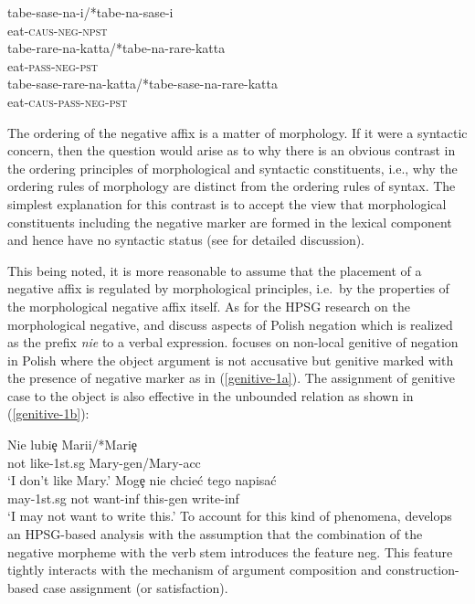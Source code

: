 \documentclass[output=paper
                ,modfonts
		,nonflat
	        ,collection
	        ,collectionchapter
	        ,collectiontoclongg
 	        ,biblatex  
                ,babelshorthands
                ,newtxmath
                ,draftmode
                ,colorlinks, citecolor=brown 
]{./langsci/langscibook}
\begin{document}
{\begin{exe}
\begin{xlist}
\begin{exe}
\begin{xlist}
\eal
\ex
\gll tabe-sase-na-i/*tabe-na-sase-i \\
     eat-\textsc{caus}-\textsc{neg}-\textsc{npst} \\

\ex
\gll tabe-rare-na-katta/*tabe-na-rare-katta \\
     eat-\textsc{pass}-\textsc{neg}-\textsc{pst} \\

\ex
\gll tabe-sase-rare-na-katta/*tabe-sase-na-rare-katta \\
     eat-\textsc{caus}-\textsc{pass}-\textsc{neg}-\textsc{pst} \\
\zl

\noindent
The ordering of the negative affix is a matter of morphology.
If it were a syntactic concern, then
the question would arise as to why
there is an obvious contrast in the ordering principles
of morphological and syntactic constituents, i.e., why the ordering
rules of morphology are distinct from the ordering rules of syntax. The
simplest explanation for this contrast is to accept
the view that morphological constituents including the negative marker
are formed in the lexical component and hence have no syntactic
status (see \citep{Kim:00} for detailed discussion).

This being noted, it is more reasonable to assume that the placement of a
negative affix is regulated by morphological principles, i.e.\ by
the properties of the morphological negative affix itself.
As for the HPSG research on the morphological negative, \citet{PK:99} and \citet{Prz:00, Prz:01}
discuss aspects of Polish negation which is realized as the prefix
  {\it nie} to a verbal expression.
 \citet{Prz:00} focuses on non-local genitive of negation in Polish where the object argument is not accusative but genitive marked with the presence of negative marker as in (\ref{genitive-1a}). The assignment of genitive case to the object is also effective in
  the unbounded relation as shown in (\ref{genitive-1b}):

\eal
\ex \label{genitive-1a}
\gll Nie lubi\c{e} Marii/*Mari\c{e} \\
     not like-1st.{\sc sg} Mary-{\sc gen}/Mary-{\sc acc}\\
\glt `I don't like Mary.'
\ex \label{genitive-1b}
\gll Mog\c{e} nie chcie\'{c} tego napisa\'{c} \\
     may-1st.{\sc sg} not want-{\sc inf} this-{\sc gen} write-{\sc inf}\\
\glt `I may not want to write this.'
\zl
To account for this kind of phenomena, \citet{Prz:00} develops
an HPSG-based analysis with the assumption that the combination of the
negative morpheme with the verb stem introduces the feature {\sc neg}. This feature
tightly interacts with the mechanism of argument composition and construction-based case assignment (or satisfaction).


\end{xlist}
\end{exe}
\end{xlist}
\end{exe}}
\end{document}
